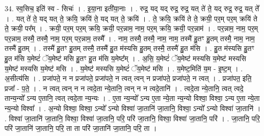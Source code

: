 \documentclass[17pt]{extarticle}
\begin{document}
34. स्व॒सिच॒ इति॑ स्व - सिचः॑ । . इ॒या॒ना इती॑या॒नाः । . रुद्र॒ यद् यद् रुद्र॒ रुद्र॒ यत् ते॑ ते॒ यद् रुद्र॒ रुद्र॒ यत् ते᳚ । . यत् ते॑ ते॒ यद् यत् ते॒ क्रयि॒ क्रयि॑ ते॒ यद् यत् ते॒ क्रयि॑ । . ते॒ क्रयि॒ क्रयि॑ ते ते॒ क्रयी॒ पर॒म् पर॒म् क्रयि॑ ते ते॒ क्रयी॒ पर᳚म् । . क्रयी॒ पर॒म् पर॒म् क्रयि॒ क्रयी॒ पर॒न्नाम॒ नाम॒ पर॒म् क्रयि॒ क्रयी॒ पर॒न्नाम॑ । . पर॒न्नाम॒ नाम॒ पर॒म् पर॒न्नाम॒ तस्मै॒ तस्मै॒ नाम॒ पर॒म् पर॒न्नाम॒ तस्मै᳚ । . नाम॒ तस्मै॒ तस्मै॒ नाम॒ नाम॒ तस्मै॑ हु॒तꣳ हु॒तम् तस्मै॒ नाम॒ नाम॒ तस्मै॑ हु॒तम् । . तस्मै॑ हु॒तꣳ हु॒तम् तस्मै॒ तस्मै॑ हु॒त म॑स्यसि हु॒तम् तस्मै॒ तस्मै॑ हु॒त म॑सि । . हु॒त म॑स्यसि हु॒तꣳ हु॒त म॑सि य॒मेष्टं॑ ॅय॒मेष्ट॑ मसि हु॒तꣳ हु॒त म॑सि य॒मेष्ट᳚म् । . अ॒सि॒ य॒मेष्टं॑ ॅय॒मेष्ट॑ मस्यसि य॒मेष्ट॑ मस्यसि य॒मेष्ट॑ मस्यसि य॒मेष्ट॑ मसि । . य॒मेष्ट॑ मस्यसि य॒मेष्टं॑ ॅय॒मेष्ट॑ मसि । . य॒मेष्ट॒मिति॑ य॒म - इ॒ष्ट॒म् । . अ॒सीत्य॑सि । . प्रजा॑पते॒ न न प्रजा॑पते॒ प्रजा॑पते॒ न त्वत् त्वन् न प्रजा॑पते॒ प्रजा॑पते॒ न त्वत् । . प्रजा॑पत॒ इति॒ प्रजा᳚ - प॒ते॒ । . न त्वत् त्वन् न न त्वदे॒ता न्ये॒तानि॒ त्वन् न न त्वदे॒तानि॑ । . त्वदे॒ता न्ये॒तानि॒ त्वत् त्वदे॒ तान्य॒न्यो᳚ ऽन्य ए॒तानि॒ त्वत् त्वदे॒ता न्य॒न्यः । . ए॒ता न्य॒न्यो᳚ ऽन्य ए॒ता न्ये॒ता न्य॒न्यो विश्वा॒ विश्वा॒ ऽन्य ए॒ता न्ये॒ता न्य॒न्यो विश्वा᳚ । . अ॒न्यो विश्वा॒ विश्वा॒ ऽन्यो᳚ ऽन्यो विश्वा॑ जा॒तानि॑ जा॒तानि॒ विश्वा॒ ऽन्यो᳚ ऽन्यो विश्वा॑ जा॒तानि॑ । . विश्वा॑ जा॒तानि॑ जा॒तानि॒ विश्वा॒ विश्वा॑ जा॒तानि॒ परि॒ परि॑ जा॒तानि॒ विश्वा॒ विश्वा॑ जा॒तानि॒ परि॑ । . जा॒तानि॒ परि॒ परि॑ जा॒तानि॑ जा॒तानि॒ परि॒ ता ता परि॑ जा॒तानि॑ जा॒तानि॒ परि॒ ता । \newline
\end{document}
